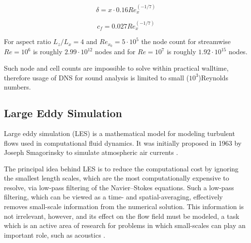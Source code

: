 \begin{equation} \label{eq:delta}
\delta = x \cdot  0.16 Re_x^{(-1/7)}
\end{equation}

\begin{equation} \label{eq:cf}
c_f = 0.027 Re_x^{(-1/7)}
\end{equation}

For aspect ratio $L_z / L_x = 4$ and $Re_{x_0} = 5 \cdot 10^5$ the node count for streamwise $Re = 10^6$ is roughly $2.99 \cdot 10^{12}$ nodes and for $Re = 10^7$ is roughly $1.92 \cdot 10^{15}$ nodes.

Such node and cell counts are impossible to solve within practical walltime, therefore usage of DNS for sound analysis is limited to small ($10^3$)Reynolds numbers.




\subsection{Large Eddy Simulation} \label{LES}
Large eddy simulation (LES) is a mathematical model for modeling turbulent flows used in computational fluid dynamics. It was initially proposed in 1963 by Joseph Smagorinsky to simulate atmospheric air currents \citep{LES1}.

The principal idea behind LES is to reduce the computational cost by ignoring the smallest length scales, which are the most computationally expensive to resolve, via low-pass filtering of the Navier–Stokes equations. Such a low-pass filtering, which can be viewed as a time- and spatial-averaging, effectively removes small-scale information from the numerical solution. This information is not irrelevant, however, and its effect on the flow field must be modeled, a task which is an active area of research for problems in which small-scales can play an important role, such as acoustics \citep{LES2}.

